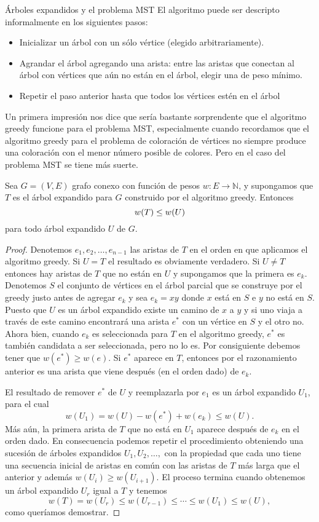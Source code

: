 \begin{section}{Árboles expandidos y el problema MST}
El  algoritmo puede ser descripto informalmente en los siguientes pasos:
\begin{itemize}
\item Inicializar un árbol con un sólo vértice (elegido arbitrariamente).
\item Agrandar el árbol agregando una arista: entre las aristas que conectan al árbol con vértices que aún no están en el árbol, elegir una de peso mínimo.
\item Repetir el paso anterior hasta que todos los vértices estén en el árbol
\end{itemize}


Un primera impresión nos dice que sería bastante sorprendente que
el algoritmo greedy funcione para el problema MST, especialmente
cuando recordamos que el algoritmo greedy para el problema de
coloración de vértices no siempre produce una coloración con el
menor número posible de co\-lo\-res. Pero en el caso del problema MST
se tiene más suerte.

\begin{teorema}\label{t6.2} Sea $G=(V,E)$ grafo conexo con función de
pesos $w: E \to  \mathbb N$, y supongamos que $T$ es el árbol
expandido para $G$ construido por el algoritmo greedy. Entonces
$$
w(T) \le w(U) \nopagebreak
$$
para todo árbol expandido $U$ de $G$.
\end{teorema}
\begin{proof} Denotemos $e_1,e_2,\ldots,e_{n-1}$ las
aristas de $T$ en el orden en que aplicamos el algoritmo greedy.
Si $U=T$ el resultado es obviamente verdadero. Si $U\not=T$
entonces hay aristas de $T$ que no están en $U$ y supongamos que
la primera es $e_k$. Denotemos $S$ el conjunto de vértices en el
árbol parcial que se construye por el greedy justo antes de
agregar $e_k$ y sea $e_k=xy$ donde $x$ está en $S$ e $y$ no está
en $S$. Puesto que $U$ es un árbol expandido existe un camino de
$x$ a $y$ y si uno viaja a través de este camino encontrará una
arista $e^*$ con un vértice en $S$ y el otro no. Ahora bien,
cuando $e_k$ es seleccionada para $T$ en el algoritmo greedy,
$e^*$ es también candidata a ser seleccionada, pero no lo es. Por
consiguiente debemos tener que $w(e^*) \ge w(e)$. Si $e^*$ aparece
en $T$, entonces por el razonamiento anterior es una arista que
viene después (en el orden dado) de $e_k$.

El resultado de remover $e^*$ de $U$ y reemplazarla por $e_1$ es
un árbol expandido $U_1$, para el cual
$$
w(U_1) = w(U) -w(e^*)+w(e_k) \le w(U).
$$
Más aún, la primera arista de $T$ que no está en $U_1$ aparece
después de $e_k$ en el orden dado. En consecuencia podemos repetir
el procedimiento obteniendo una sucesión de árboles expandidos
$U_1,U_2,\ldots,$ con la propiedad que cada uno tiene una
secuencia inicial de aristas en común con las aristas de $T$ más
larga que el anterior y además $w(U_i) \ge w(U_{i+1})$. El proceso
termina cuando obtenemos un árbol expandido $U_r$ igual a $T$ y
tenemos
$$
w(T)=w(U_r) \le w(U_{r-1}) \le \cdots \le w(U_1) \le w(U),
$$
como queríamos demostrar.
\end{proof}


\end{section}
